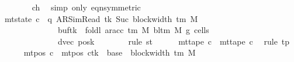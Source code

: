 \begin{isabellebody}
\ \ \ \ \ \ \isamarkupfalse%
\ ch{}{}\ \isamarkupfalse%
\ {\isacharparenleft}{\kern0pt}simp\ only{\isacharcolon}{\kern0pt}\ eqn{\isacharbrackleft}{\kern0pt}symmetric{\isacharbrackright}{\kern0pt}{\isacharparenright}{\kern0pt}\isanewline
\ \ \ \ \isamarkupfalse%
\ {\isachardoublequoteopen}mt{\isacharunderscore}{\kern0pt}state\ c{}\ {\isacharequal}{\kern0pt}\ {\isacharparenleft}{\kern0pt}q{\isacharcomma}{\kern0pt}\ AR{\isacharunderscore}{\kern0pt}SimRead{\isacharcomma}{\kern0pt}\ tk{\isacharcomma}{\kern0pt}\ Suc\ {\isacharparenleft}{\kern0pt}block{\isacharunderscore}{\kern0pt}width\ {\isacharparenleft}{\kern0pt}{\isasymGamma}{\isacharunderscore}{\kern0pt}tm\ M{\isacharparenright}{\kern0pt}{\isacharparenright}{\kern0pt}{\isacharcomma}{\kern0pt}\isanewline
\ \ \ \ \ \ \ \ \ \ \ \ \ \ buf{\isacharparenleft}{\kern0pt}tk\ {\isacharcolon}{\kern0pt}{\isacharequal}{\kern0pt}\ foldl\ {\isacharparenleft}{\kern0pt}ar{\isacharunderscore}{\kern0pt}acc\ {\isacharparenleft}{\kern0pt}{\isasymGamma}{\isacharunderscore}{\kern0pt}tm\ M{\isacharparenright}{\kern0pt}\ {\isacharparenleft}{\kern0pt}bl{\isacharunderscore}{\kern0pt}tm\ M{\isacharparenright}{\kern0pt}{\isacharparenright}{\kern0pt}\ {\isacharquery}{\kern0pt}g{}\ {\isacharquery}{\kern0pt}cells{}{\isacharparenright}{\kern0pt}{\isacharcomma}{\kern0pt}\isanewline
\ \ \ \ \ \ \ \ \ \ \ \ \ \ dvec{\isacharcomma}{\kern0pt}\ {\isacharquery}{\kern0pt}posk{\isacharprime}{\kern0pt}{\isacharparenright}{\kern0pt}{\isachardoublequoteclose}\isanewline
\ \ \ \ \ \ \isamarkupfalse%
\ {\isacharparenleft}{\kern0pt}rule\ st{}{\isacharprime}{\kern0pt}{\isacharparenright}{\kern0pt}\isanewline
\ \ \ \ \isamarkupfalse%
\ {\isachardoublequoteopen}mt{\isacharunderscore}{\kern0pt}tape\ c{}\ {\isacharequal}{\kern0pt}\ mt{\isacharunderscore}{\kern0pt}tape\ c{\isacharprime}{\kern0pt}{\isachardoublequoteclose}\ \isamarkupfalse%
\ {\isacharparenleft}{\kern0pt}rule\ tp{}{\isacharprime}{\kern0pt}{\isacharparenright}{\kern0pt}\isanewline
\ \ \ \ \isamarkupfalse%
\ {\isachardoublequoteopen}mt{\isacharunderscore}{\kern0pt}pos\ c{}\ {\isacharequal}{\kern0pt}\ {\isacharparenleft}{\kern0pt}mt{\isacharunderscore}{\kern0pt}pos\ c{\isacharprime}{\kern0pt}{\isacharparenright}{\kern0pt}{\isacharparenleft}{\kern0pt}tk\ {\isacharcolon}{\kern0pt}{\isacharequal}{\kern0pt}\ base\ {\isacharplus}{\kern0pt}\ {\isacharparenleft}{\kern0pt}block{\isacharunderscore}{\kern0pt}width\ {\isacharparenleft}{\kern0pt}{\isasymGamma}{\isacharunderscore}{\kern0pt}tm\ M{\isacharparenright}{\kern0pt}\ {\isacharminus}{\kern0pt}\ {}{\isacharparenright}{\kern0pt}{\isacharparenright}{\kern0pt}{\isachardoublequoteclose}\isanewline

\end{isabellebody}
